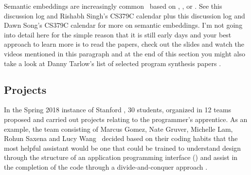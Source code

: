 Semantic embeddings are increasingly common~\cite{DevlinetalICLR-18,ChistyakovetalICLR-17,WangetalCoRR-17,XuetalCoRR-17,PiechetalICML-15} based on {}, {}, or {}. See this discussion log {} and Rishabh Singh's CS379C calendar {} plus this discussion log {} and Dawn Song's CS379C calendar {} for more on semantic embeddings. I'm not going into detail here for the simple reason that it is still early days and your best approach to learn more is to read the papers, check out the slides and watch the videos mentioned in this paragraph and at the end of this section \emdash{} you might also take a look at Danny Tarlow's list of selected program synthesis papers {}.


\subsection{Projects}


In the Spring 2018 instance of Stanford {}, 30 students, organized in 12 teams proposed and carried out projects relating to the programmer's apprentice. As an example, the team consisting of Marcus Gomez, Nate Gruver, Michelle Lam, Rohun Saxena and Lucy Wang~\cite{CS379C_Final_Project_Gomezetal-18} decided based on their coding habits that the most helpful assistant would be one that could be trained to understand design through the structure of an application programming interface ({}) and assist in the completion of the code through a divide-and-conquer approach {}.

